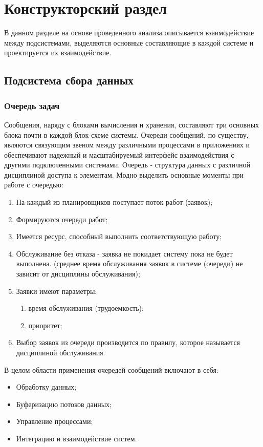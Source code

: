 \chapter{Конструкторский раздел}
\label{cha:design}

В данном разделе на основе проведенного анализа описывается взаимодействие между подсистемами, выделяются основные составляющие в каждой системе и проектируется их взаимодействие.

\section{Подсистема сбора данных}
\subsection{Очередь задач}
Сообщения, наряду с блоками вычисления и хранения, составляют три основных блока почти в каждой блок-схеме системы. Очереди сообщений, по существу, являются связующим звеном между различными процессами в приложениях и обеспечивают надежный и масштабируемый интерфейс взаимодействия с другими подключенными системами.
Очередь - структура данных с различной дисциплиной доступа к элементам.
Модно выделить основные моменты при работе с очередью:
\begin{enumerate}
  \item На каждый из планировщиков поступает поток работ (заявок);
  \item Формируются очереди работ;
  \item Имеется ресурс, способный выполнить соответствующую работу;
  \item Обслуживание без отказа - заявка не покидает систему пока не будет выполнена. (среднее время обслуживания заявок в системе (очереди) не зависит от дисциплины обслуживания);
  \item Заявки имеют параметры:
  \begin{enumerate}
  	\item время обслуживания (трудоемкость);
  	\item приоритет;
	\end{enumerate}
  \item Выбор заявок из очереди производится по правилу, которое называется дисциплиной обслуживания.
\end{enumerate}

В целом области применения очередей сообщений включают в себя:

\begin{itemize}
  \item Обработку данных;
  \item Буферизацию потоков данных;
  \item Управление процессами;
  \item Интеграцию и взаимодействие систем.
\end{itemize}

